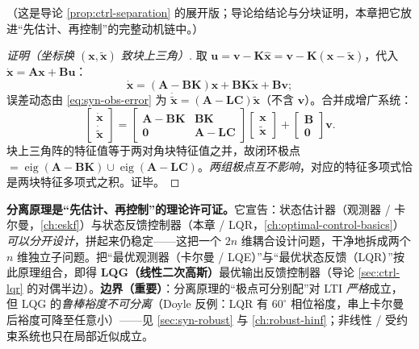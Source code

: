 \noindent{}（这是导论 \cref{prop:ctrl-separation} 的展开版；导论给结论与分块证明，本章把它放进“先估计、再控制”的完整动机链中。）

\begin{proof}[证明（坐标换 $(\mathbf x,\tilde{\mathbf x})$ 致块上三角）]
取 $\mathbf u=\mathbf v-\mathbf K\hat{\mathbf x}=\mathbf v-\mathbf K(\mathbf x-\tilde{\mathbf x})$，代入 $\dot{\mathbf x}=\mathbf A\mathbf x+\mathbf B\mathbf u$：
\begin{equation}
  \dot{\mathbf x}=(\mathbf A-\mathbf B\mathbf K)\mathbf x+\mathbf B\mathbf K\tilde{\mathbf x}+\mathbf B\mathbf v;
\end{equation}
误差动态由 \cref{eq:syn-obs-error} 为 $\dot{\tilde{\mathbf x}}=(\mathbf A-\mathbf L\mathbf C)\tilde{\mathbf x}$（不含 $\mathbf v$）。合并成增广系统：
\begin{equation}
  \begin{bmatrix}\dot{\mathbf x}\\\dot{\tilde{\mathbf x}}\end{bmatrix}=\begin{bmatrix}\mathbf A-\mathbf B\mathbf K&\mathbf B\mathbf K\\\mathbf 0&\mathbf A-\mathbf L\mathbf C\end{bmatrix}\begin{bmatrix}\mathbf x\\\tilde{\mathbf x}\end{bmatrix}+\begin{bmatrix}\mathbf B\\\mathbf 0\end{bmatrix}\mathbf v.
  \label{eq:syn-sep-augmented}
\end{equation}
块上三角阵的特征值等于两对角块特征值之并，故闭环极点 $=\operatorname{eig}(\mathbf A-\mathbf B\mathbf K)\cup\operatorname{eig}(\mathbf A-\mathbf L\mathbf C)$。\emph{两组极点互不影响}，对应的特征多项式恰是两块特征多项式之积。证毕。
\end{proof}

\begin{insight}
\textbf{分离原理是“先估计、再控制”的理论许可证。}\;它宣告：状态估计器（观测器 / 卡尔曼，\cref{ch:eskf}）与状态反馈控制器（本章 / LQR，\cref{ch:optimal-control-basics}）\emph{可以分开设计}，拼起来仍稳定——这把一个 $2n$ 维耦合设计问题，干净地拆成两个 $n$ 维独立子问题。把“最优观测器（卡尔曼 / LQE）”与“最优状态反馈（LQR）”按此原理组合，即得 \textbf{LQG（线性二次高斯）}最优输出反馈控制器（导论 \cref{sec:ctrl-lqr} 的对偶半边）。\textbf{边界（重要）}：分离原理的“极点可分别配”对 LTI \emph{严格}成立，但 LQG 的\emph{鲁棒裕度不可分离}（Doyle 反例：LQR 有 $60^\circ$ 相位裕度，串上卡尔曼后裕度可降至任意小）——见 \cref{sec:syn-robust} 与 \cref{ch:robust-hinf}；非线性 / 受约束系统也只在局部近似成立。
\end{insight}

